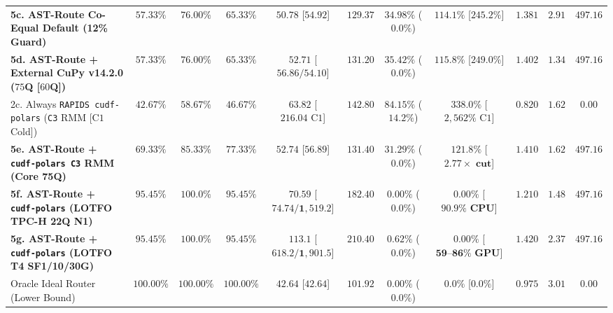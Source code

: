 \documentclass[10pt,a4paper]{article}
\newenvironment{fitasttable}{%
  \begin{lrbox}{\asttblbox}%
}{%
  \end{lrbox}%
  \sbox{\asttblboxB}{%
    \ifdim\wd\asttblbox>0.96\textwidth
      \resizebox{0.96\textwidth}{!}{\usebox{\asttblbox}}%
    \else
      \usebox{\asttblbox}%
    \fi
  }%
  \ifdim\ht\asttblboxB>0.72\textheight
    \resizebox{!}{0.72\textheight}{\usebox{\asttblboxB}}%
  \else
    \usebox{\asttblboxB}%
  \fi
}
\begin{document}
\begin{table}[!htbp]
\begin{fitasttable}
\begin{tabular}{@{}lcccccccccc@{}}
\textbf{5c. AST-Route Co-Equal Default (12\% Guard)} & $\mathbf{57.33\%}$ & $\mathbf{76.00\%}$ & $\mathbf{65.33\%}$ & $\mathbf{50.78}$ [$\mathbf{54.92}$] & $\mathbf{129.37}$ & $\mathbf{34.98\%}$ ($\mathbf{0.0\%}$) & $\mathbf{114.1\%}$ [$\mathbf{245.2\%}$] & $\mathbf{1.381}$ & $\mathbf{2.91}$ & $\mathbf{497.16}$ \\
\textbf{5d. AST-Route + External CuPy v14.2.0 ($75$Q [$60$Q])} & $\mathbf{57.33\%}$ & $\mathbf{76.00\%}$ & $\mathbf{65.33\%}$ & $\mathbf{52.71}$ [$\mathbf{56.86 / 54.10}$] & $\mathbf{131.20}$ & $\mathbf{35.42\%}$ ($\mathbf{0.0\%}$) & $\mathbf{115.8\%}$ [$\mathbf{249.0\%}$] & $\mathbf{1.402}$ & $\mathbf{1.34}$ & $\mathbf{497.16}$ \\
2c. Always \texttt{RAPIDS cudf-polars} (\texttt{C3} RMM [$\text{C1}$ Cold]) & $42.67\%$ & $58.67\%$ & $46.67\%$ & $63.82$ [$216.04\text{ C1}$] & $142.80$ & $84.15\%$ ($14.2\%$) & $338.0\%$ [$2{,}562\%\text{ C1}$] & $0.820$ & $1.62$ & $0.00$ \\
\textbf{5e. AST-Route + \texttt{cudf-polars C3} RMM (Core 75Q)} & $\mathbf{69.33\%}$ & $\mathbf{85.33\%}$ & $\mathbf{77.33\%}$ & $\mathbf{52.74}$ [$\mathbf{56.89}$] & $\mathbf{131.40}$ & $\mathbf{31.29\%}$ ($\mathbf{0.0\%}$) & $\mathbf{121.8\%}$ [$\mathbf{2.77\times\text{ cut}}$] & $\mathbf{1.410}$ & $\mathbf{1.62}$ & $\mathbf{497.16}$ \\
\textbf{5f. AST-Route + \texttt{cudf-polars} (LOTFO TPC-H 22Q N1)} & $\mathbf{95.45\%}$ & $\mathbf{100.0\%}$ & $\mathbf{95.45\%}$ & $\mathbf{70.59}$ [$\mathbf{74.74 / 1{,}519.2}$] & $\mathbf{182.40}$ & $\mathbf{0.00\%}$ ($\mathbf{0.0\%}$) & $\mathbf{0.00\%}$ [$\mathbf{90.9\%\text{ CPU}}$] & $\mathbf{1.210}$ & $\mathbf{1.48}$ & $\mathbf{497.16}$ \\
\textbf{5g. AST-Route + \texttt{cudf-polars} (LOTFO T4 SF1/10/30G)} & $\mathbf{95.45\%}$ & $\mathbf{100.0\%}$ & $\mathbf{95.45\%}$ & $\mathbf{113.1}$ [$\mathbf{618.2 / 1{,}901.5}$] & $\mathbf{210.40}$ & $\mathbf{0.62\%}$ ($\mathbf{0.0\%}$) & $\mathbf{0.00\%}$ [$\mathbf{59\text{--}86\%\text{ GPU}}$] & $\mathbf{1.420}$ & $\mathbf{2.37}$ & $\mathbf{497.16}$ \\
Oracle Ideal Router (Lower Bound) & $100.00\%$ & $100.00\%$ & $100.00\%$ & $42.64$ [$42.64$] & $101.92$ & $0.00\%$ ($0.0\%$) & $0.0\%$ [$0.0\%$] & $0.975$ & $3.01$ & $0.00$ \\
\bottomrule

\end{tabular}
\end{fitasttable}
\end{table}
\end{document}
